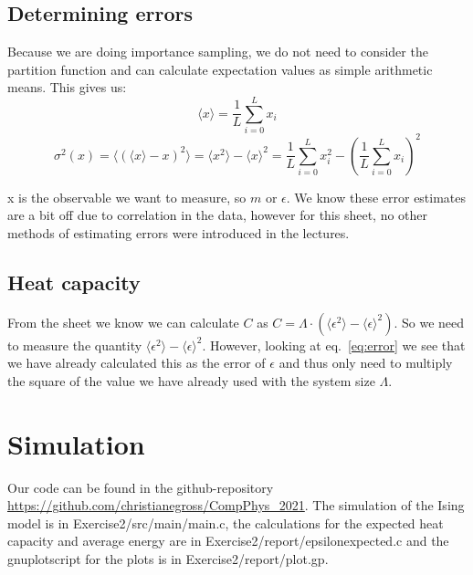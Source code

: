 \documentclass{scrartcl}
\begin{document}
\subsection{Determining errors}

Because we are doing importance sampling, we do not need to consider the partition function and can calculate expectation values as simple arithmetic means. This gives us:
\begin{equation}
\langle x\rangle=\frac{1}{L}\sum_{i=0}^{L} x_i
\end{equation}
\begin{equation}
\sigma^2(x)=\langle (\langle x\rangle-x)^2\rangle=\langle x^2\rangle-\langle x\rangle^2=\frac{1}{L}\sum_{i=0}^{L} x_i^2-\left( \frac{1}{L}\sum_{i=0}^{L} x_i\right) ^2
\label{eq:error}
\end{equation}

x is the observable we want to measure, so $m$ or $\epsilon$. We know these error estimates are a bit off due to correlation in the data, however for this sheet, no other methods of estimating errors were introduced in the lectures.

\subsection{Heat capacity}

From the sheet we know we can calculate $C$ as $C=\Lambda\cdot(\langle \epsilon^2\rangle-\langle \epsilon\rangle^2)$. So we need to measure the quantity $\langle \epsilon^2\rangle-\langle \epsilon\rangle^2$. However, looking at eq.~\ref{eq:error} we see that we have already calculated this as the error of $\epsilon$ and thus only need to multiply the square of the value we have already used with the system size $\Lambda$.

\section{Simulation}

Our code can be found in the github-repository \url{https://github.com/christianegross/CompPhys\_2021}. The simulation of the Ising model is in Exercise2/src/main/main.c, the calculations for the expected heat capacity and average energy are in Exercise2/report/epsilonexpected.c and the gnuplotscript for the plots is in Exercise2/report/plot.gp.
\end{document}
